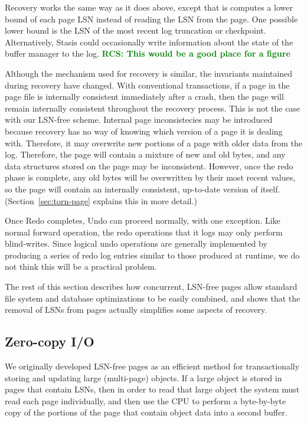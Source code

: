 \documentclass[letterpaper,twocolumn,10pt]{article}
\newcommand{\yad}{Stasis\xspace}
\newcommand{\rcs}[1]{\textcolor{green}{\bf RCS: #1}}
\begin{document}
Recovery works the same way as it does above, except that is computes
a lower bound of each page LSN instead of reading the LSN from the
page.  One possible lower bound is the LSN of the most recent log
truncation or checkpoint.  Alternatively, \yad could occasionally
write information about the state of the buffer manager to the log. \rcs{This would be a good place for a figure}

Although the mechanism used for recovery is similar, the invariants
maintained during recovery have changed.  With conventional
transactions, if a page in the page file is internally consistent
immediately after a crash, then the page will remain internally
consistent throughout the recovery process.  This is not the case with
our LSN-free scheme.  Internal page inconsistecies may be introduced
because recovery has no way of knowing which version of a page it is
dealing with.  Therefore, it may overwrite new portions of a page with
older data from the log.
Therefore, the page will contain a mixture of new and old bytes, and
any data structures stored on the page may be inconsistent.  However,
once the redo phase is complete, any old bytes will be overwritten by
their most recent values, so the page will contain an internally
consistent, up-to-date version of itself.
(Section~\ref{sec:torn-page} explains this in more detail.)

Once Redo completes, Undo can proceed normally, with one exception.
Like normal forward operation, the redo operations that it logs may
only perform blind-writes.  Since logical undo operations are
generally implemented by producing a series of redo log entries
similar to those produced at runtime, we do not think this will be a
practical problem.

The rest of this section describes how concurrent, LSN-free pages 
allow standard file system and database optimizations to be easily
combined, and shows that the removal of LSNs from pages actually
simplifies some aspects of recovery.

\subsection{Zero-copy I/O} 

We originally developed LSN-free pages as an efficient method for
transactionally storing and updating large (multi-page) objects.  If a
large object is stored in pages that contain LSNs, then in order to
read that large object the system must read each page individually,
and then use the CPU to perform a byte-by-byte copy of the portions of
the page that contain object data into a second buffer.
\end{document}
